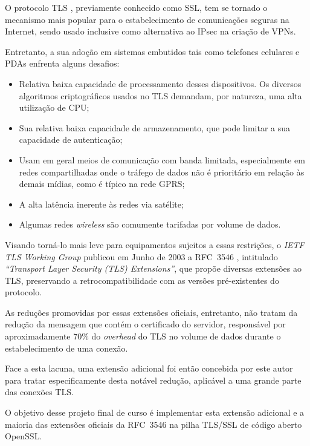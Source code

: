 
O protocolo \ac{TLS} \cite{rfc_tls}, previamente conhecido como \ac{SSL}, tem
se tornado o mecanismo mais popular para o estabelecimento de comunicações
seguras na Internet, sendo usado inclusive como alternativa ao \acs{IPsec} na
criação de \acp{VPN}.

Entretanto, a sua adoção em sistemas embutidos tais como telefones celulares e
\acsp{PDA} enfrenta alguns desafios:

\begin{itemize}
\item Relativa baixa capacidade de processamento desses dispositivos. Os 
diversos algoritmos criptográficos usados no TLS demandam, por 
natureza, uma alta utilização de CPU;
\item Sua relativa baixa capacidade de armazenamento, que pode limitar a sua
capacidade de autenticação;
\item Usam em geral meios de comunicação com banda limitada, especialmente em redes
compartilhadas onde o tráfego de dados não é prioritário em relação às demais mídias,
como é típico na rede \acs{GPRS};
\item A alta latência inerente às redes via satélite;
\item Algumas redes \emph{wireless} são comumente tarifadas por volume de dados.
\end{itemize}

Visando torná-lo mais leve para equipamentos sujeitos a essas restrições, o
\emph{IETF TLS Working Group} publicou em Junho de 2003 a RFC~3546
\cite{rfc_tlsext}, intitulado \emph{``Transport Layer Security (TLS) Extensions''},
que propõe diversas extensões ao TLS, preservando a
retrocompatibilidade com as versões pré-existentes do protocolo.

As reduções promovidas por essas extensões oficiais, entretanto, não tratam da redução da mensagem
que contém o certificado do servidor, responsável por aproximadamente 70\% do \emph{overhead}
do TLS no volume de dados durante o estabelecimento de uma conexão.

Face a esta lacuna, uma extensão adicional foi então concebida por este autor para tratar especificamente
desta notável redução, aplicável a uma grande parte das conexões TLS.

O objetivo desse projeto final de curso é implementar esta extensão adicional e a maioria das
extensões oficiais da RFC~3546 na pilha TLS/SSL de código aberto OpenSSL.
